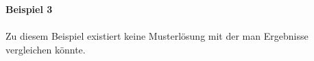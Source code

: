 \newpage
\noindent
\textbf{Beispiel 3} \\ \\
Zu diesem Beispiel existiert keine Musterlösung mit der man Ergebnisse vergleichen könnte. \\ \\